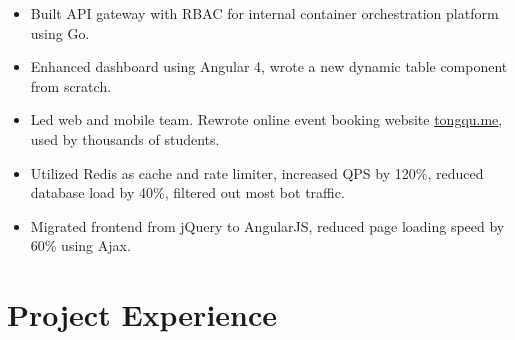 \documentclass[11pt, letterpaper]{simple-cv}
\begin{document}
\begin{itemize}
	\item Built API gateway with RBAC for internal container orchestration platform using Go.
	\item Enhanced dashboard using Angular 4, wrote a new dynamic table component from scratch.
\end{itemize}


\begin{itemize}
	\item Led web and mobile team. Rewrote online event booking website \href{https://tongqu.me}{tongqu.me}, used by thousands of students.
	\item Utilized Redis as cache and rate limiter, increased QPS by 120\%, reduced database load by 40\%, filtered out most bot traffic.
	\item Migrated frontend from jQuery to AngularJS, reduced page loading speed by 60\% using Ajax.
\end{itemize}

\section{Project Experience}

\end{document}
